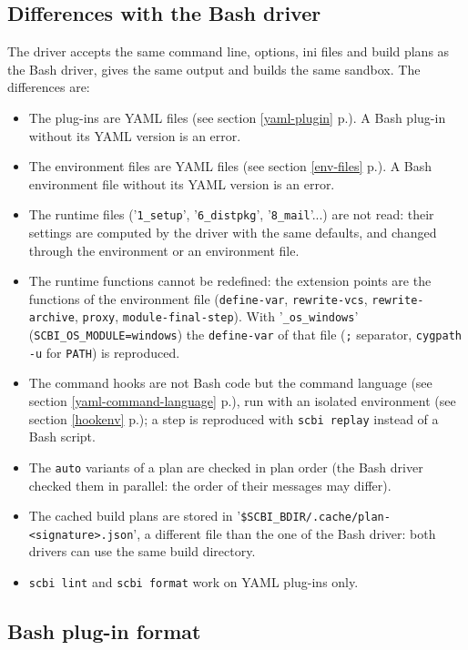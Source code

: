 \documentclass[a4paper,12pt,twoside]{article}
\newcommand{\code}[1]{\texttt{#1}}
\newcommand{\seeref}[1]{see section \ref{#1} p.\pageref{#1}}
\newcommand{\file}[1]{'{\texttt{#1}}'}
\begin{document}
\subsection{Differences with the Bash driver}

The driver accepts the same command line, options, ini files and build
plans as the Bash driver, gives the same output and builds the same
sandbox. The differences are:

\begin{itemize}
	\item The plug-ins are YAML files (\seeref{yaml-plugin}). A Bash plug-in
	without its YAML version is an error.
	\item The environment files are YAML files (\seeref{env-files}).
	A Bash environment file without its YAML version is an error.
	\item The runtime files (\file{1\_setup}, \file{6\_distpkg},
	\file{8\_mail}...) are not read: their settings are computed by the
	driver with the same defaults, and changed through the environment or
	an environment file.
	\item The runtime functions cannot be redefined: the extension points
	are the functions of the environment file (\code{define-var},
	\code{rewrite-vcs}, \code{rewrite-archive}, \code{proxy},
	\code{module-final-step}). With \file{\_os\_windows}
	(\code{SCBI\_OS\_MODULE=windows}) the \code{define-var} of that file
	(\code{;} separator, \code{cygpath -u} for \code{PATH}) is reproduced.
	\item The command hooks are not Bash code but the command language
	(\seeref{yaml-command-language}), run with an isolated environment
	(\seeref{hookenv}); a step is reproduced with \code{scbi replay}
	instead of a Bash script.
	\item The \code{auto} variants of a plan are checked in plan order (the
	Bash driver checked them in parallel: the order of their messages may
	differ).
	\item The cached build plans are stored in
	\file{\$SCBI\_BDIR/.cache/plan-<signature>.json}, a different file than
	the one of the Bash driver: both drivers can use the same build
	directory.
	\item \code{scbi lint} and \code{scbi format} work on YAML plug-ins only.
\end{itemize}

\subsection{Bash plug-in format}
\end{document}
